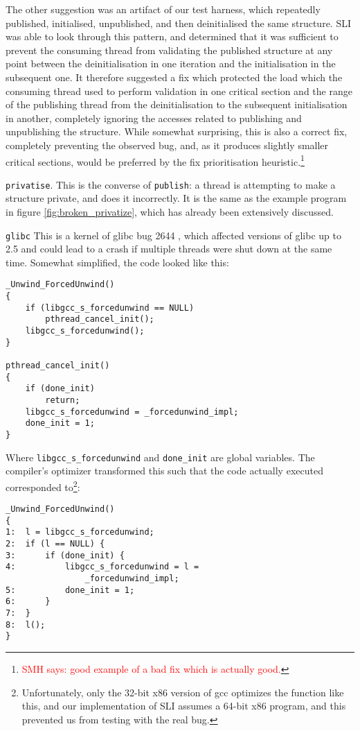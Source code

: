 \documentclass[10pt,twocolumn,preprint,natbib,authoryear]{sigplanconf}
\newcommand{\editorial}[1]{\textcolor{red}{\footnote{\textcolor{red}{#1}}}}
\newcommand{\smh}[1]{\editorial{SMH says: #1}}
\begin{document}
The other suggestion was an artifact of our test harness, which
repeatedly published, initialised, unpublished, and then deinitialised
the same structure.  SLI was able to look through this pattern, and
determined that it was sufficient to prevent the consuming thread from
validating the published structure at any point between the
deinitialisation in one iteration and the initialisation in the
subsequent one.  It therefore suggested a fix which protected the load
which the consuming thread used to perform validation in one critical
section and the range of the publishing thread from the
deinitialisation to the subsequent initialisation in another,
completely ignoring the accesses related to publishing and
unpublishing the structure.  While somewhat surprising, this is also a
correct fix, completely preventing the observed bug, and, as it
produces slightly smaller critical sections, would be preferred by the
fix prioritisation heuristic.\smh{good example of a bad fix which is
  actually good.}

\verb|privatise|.  This is the converse of \verb|publish|: a thread is
attempting to make a structure private, and does it incorrectly.  It
is the same as the example program in figure
\ref{fig:broken_privatize}, which has already been extensively
discussed.

\verb|glibc| This is a kernel of glibc bug 2644 \cite{glibc2644},
which affected versions of glibc up to 2.5 and could lead to a crash
if multiple threads were shut down at the same time.  Somewhat
simplified, the code looked like this:

\begin{verbatim}
_Unwind_ForcedUnwind()
{
    if (libgcc_s_forcedunwind == NULL)
        pthread_cancel_init();
    libgcc_s_forcedunwind();
}

pthread_cancel_init()
{
    if (done_init)
        return;
    libgcc_s_forcedunwind = _forcedunwind_impl;
    done_init = 1;
}
\end{verbatim}

Where \verb|libgcc_s_forcedunwind| and \verb|done_init| are global
variables.  The compiler's optimizer transformed this such that the
code actually executed corresponded to\footnote{Unfortunately, only
  the 32-bit x86 version of gcc optimizes the function like this, and
  our implementation of SLI assumes a 64-bit x86 program, and this
  prevented us from testing with the real bug.}:

\begin{verbatim}
_Unwind_ForcedUnwind()
{
1:  l = libgcc_s_forcedunwind;
2:  if (l == NULL) {
3:      if (done_init) {
4:          libgcc_s_forcedunwind = l =
                _forcedunwind_impl;
5:          done_init = 1;
6:      }
7:  }
8:  l();
}
\end{verbatim}
\end{document}
